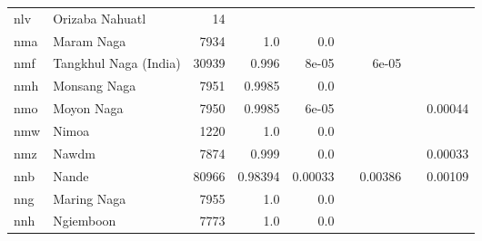 \documentclass[11pt]{article}
\begin{document}
\begin{table*}[h]
{\begin{tabular}{llrrrrrrr}
nlv         & Orizaba Nahuatl         & 14         &          &          &          &          &          &          \\

nma         & Maram Naga         & 7934         & 1.0         & 0.0         &          &          &          &          \\

nmf         & Tangkhul Naga (India)         & 30939         & 0.996         & 8e-05         &          & 6e-05         &          &          \\

nmh         & Monsang Naga         & 7951         & 0.9985         & 0.0         &          &          &          &          \\

nmo         & Moyon Naga         & 7950         & 0.9985         & 6e-05         &          &          &          & 0.00044         \\

nmw         & Nimoa         & 1220         & 1.0         & 0.0         &          &          &          &          \\

nmz         & Nawdm         & 7874         & 0.999         & 0.0         &          &          &          & 0.00033         \\

nnb         & Nande         & 80966         & 0.98394         & 0.00033         &          & 0.00386         &          & 0.00109         \\

nng         & Maring Naga         & 7955         & 1.0         & 0.0         &          &          &          &          \\

nnh         & Ngiemboon         & 7773         & 1.0         & 0.0         &          &          &          &          \\


\end{tabular}}
\end{table*}
\end{document}
